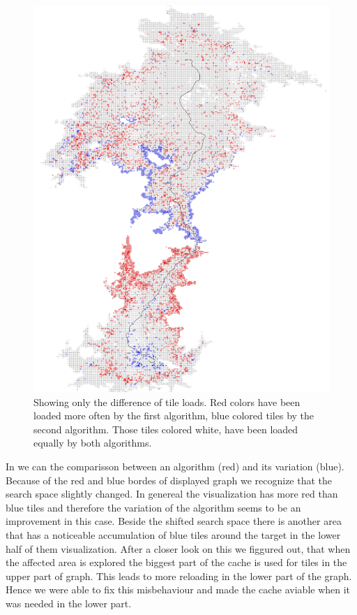 \documentclass
[
    paper = a4,
    pagesize,
    12 pt,
    oneside,                       %
    open = right,
    DIV = calc,
    BCOR = 0 mm,                   %
    bibtotoc
]
{scrbook}
\begin{document}
\begin{figure}
    \includegraphics[width=\textwidth]{Images/vis-compare-colored.png}
\caption[]{Showing only the difference of tile loads. Red colors have been loaded more often by the first algorithm, blue colored tiles by the second algorithm. Those tiles colored white, have been loaded equally by both algorithms.}
\label{fig:difference}
\end{figure}

In   we can the comparisson between an algorithm (red) and its variation (blue).
Because of the red and blue bordes of displayed graph we recognize that the search space slightly changed.
In genereal the visualization has more red than blue tiles and therefore the variation of the algorithm seems to be an improvement in this case.
Beside the shifted search space there is another area that has a noticeable accumulation of blue tiles around the target in the lower half of them visualization.
After a closer look on this we figgured out, that when the affected area is explored the biggest part of the cache is used for tiles in the upper part of graph.
This leads to more reloading in the lower part of the graph.
Hence we were able to fix this misbehaviour and made the cache aviable when it was needed in the lower part.
\end{document}
